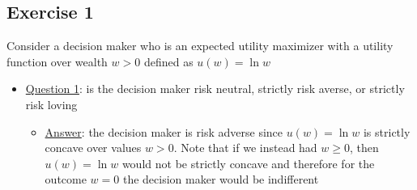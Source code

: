 \documentclass{article}
\begin{document}
\subsection{Exercise 1}
Consider a decision maker who is an expected utility maximizer with a utility function over wealth $w > 0$ defined as $u(w) = \ln w$ \par \vspace{0.3em}
  \begin{itemize}
    \item  \underline{Question 1}: is the decision maker risk neutral, strictly risk averse, or strictly risk loving
    \begin{itemize}
      \item  \underline{Answer}: the decision maker is risk adverse since $u(w) = \ln w$ is strictly concave over values $w > 0$. Note that if we instead had $w \geq 0$, then $u(w) = \ln w$ would not be strictly concave and therefore for the outcome $w=0$ the decision maker would be indifferent
    \end{itemize}
  \end{itemize}
\end{document}
